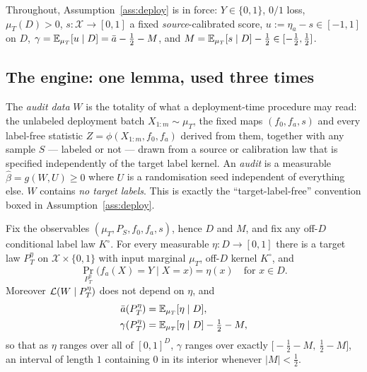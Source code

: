 Throughout, Assumption~\ref{ass:deploy} is in force: $Y\in\{0,1\}$, $0/1$ loss, $\mu_T(D)>0$,
$s:\mathcal X\to[0,1]$ a fixed \emph{source}-calibrated score, $u:=\eta_a-s\in[-1,1]$ on $D$,
$\gamma=\mathbb{E}_{\mu_T}[u\mid D]=\bar a-\tfrac12-M$, and $M=\mathbb{E}_{\mu_T}[s\mid D]-\tfrac12\in[-\tfrac12,\tfrac12]$.

\subsection{The engine: one lemma, used three times}

\begin{definition}\label{def:audit-data}
The \emph{audit data} $W$ is the totality of what a deployment-time procedure may read:
the unlabeled deployment batch $X_{1:m}\sim\mu_T$, the fixed maps $(f_0,f_a,s)$ and every
label-free statistic $Z=\phi(X_{1:m},f_0,f_a)$ derived from them, together with any sample
$S$ --- labeled or not --- drawn from a source or calibration law that is specified
independently of the target label kernel. An \emph{audit} is a measurable
$\widehat\beta=g(W,U)\ge0$ where $U$ is a randomisation seed independent of everything else.
$W$ contains \emph{no target labels}. This is exactly the ``target-label-free'' convention
boxed in Assumption~\ref{ass:deploy}.
\end{definition}

\begin{lemma}\label{lem:fibre}
Fix the observables $(\mu_T,P_S,f_0,f_a,s)$, hence $D$ and $M$, and fix any off-$D$
conditional label law $K^\circ$. For every measurable $\eta:D\to[0,1]$ there is a target law
$P_T^{\eta}$ on $\mathcal X\times\{0,1\}$ with input marginal $\mu_T$, off-$D$ kernel
$K^\circ$, and
\[
\Pr_{P_T^{\eta}}\bigl(f_a(X)=Y\mid X=x\bigr)=\eta(x)\quad\text{for }x\in D .
\]
Moreover $\mathcal{L}(W\mid P_T^{\eta})$ does not depend on $\eta$, and
\[
\begin{aligned}
\bar a(P_T^\eta)&=\mathbb{E}_{\mu_T}[\eta\mid D],\\
\gamma(P_T^\eta)&=\mathbb{E}_{\mu_T}[\eta\mid D]-\tfrac12-M ,
\end{aligned}
\]
so that as $\eta$ ranges over all of $[0,1]^D$, $\gamma$ ranges over exactly
$\bigl[-\tfrac12-M,\ \tfrac12-M\bigr]$, an interval of length $1$ containing $0$ in its
interior whenever $|M|<\tfrac12$.
\end{lemma}

